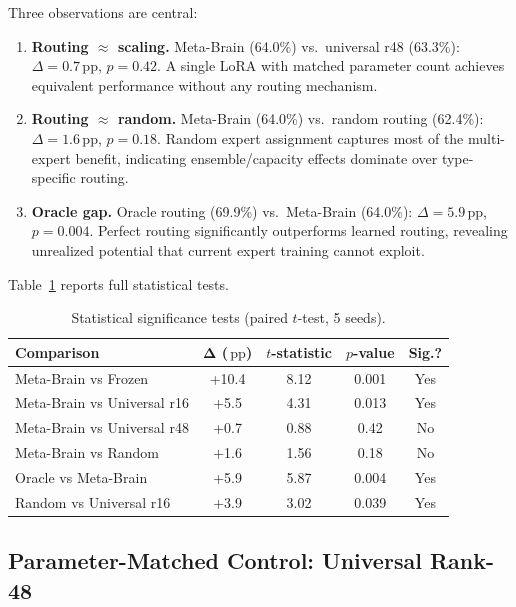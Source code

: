 \documentclass[letterpaper]{article}
\newcommand{\ours}{Meta-Brain}
\newcommand{\pp}{\,\text{pp}}
\begin{document}
Three observations are central:

\begin{enumerate}
    \item \textbf{Routing $\approx$ scaling.} \ours{} (64.0\%) vs.\ universal r48 (63.3\%): $\Delta = 0.7\pp$, $p = 0.42$. A single LoRA with matched parameter count achieves equivalent performance without any routing mechanism.
    \item \textbf{Routing $\approx$ random.} \ours{} (64.0\%) vs.\ random routing (62.4\%): $\Delta = 1.6\pp$, $p = 0.18$. Random expert assignment captures most of the multi-expert benefit, indicating ensemble/capacity effects dominate over type-specific routing.
    \item \textbf{Oracle gap.} Oracle routing (69.9\%) vs.\ \ours{} (64.0\%): $\Delta = 5.9\pp$, $p = 0.004$. Perfect routing significantly outperforms learned routing, revealing unrealized potential that current expert training cannot exploit.
\end{enumerate}

Table~\ref{tab:significance} reports full statistical tests.

\begin{table}[h]
\centering
\caption{Statistical significance tests (paired $t$-test, 5 seeds).}
\label{tab:significance}
\small
\begin{tabular}{lcccc}
\toprule
\textbf{Comparison} & $\boldsymbol{\Delta}$ \textbf{($\pp$)} & \textbf{$t$-statistic} & \textbf{$p$-value} & \textbf{Sig.?} \\
\midrule
\ours{} vs Frozen & +10.4 & 8.12 & 0.001 & Yes \\
\ours{} vs Universal r16 & +5.5 & 4.31 & 0.013 & Yes \\
\ours{} vs Universal r48 & +0.7 & 0.88 & 0.42 & No \\
\ours{} vs Random & +1.6 & 1.56 & 0.18 & No \\
Oracle vs \ours{} & +5.9 & 5.87 & 0.004 & Yes \\
Random vs Universal r16 & +3.9 & 3.02 & 0.039 & Yes \\
\bottomrule
\end{tabular}
\end{table}

\subsection{Parameter-Matched Control: Universal Rank-48}
\label{sec:r48}
\end{document}
